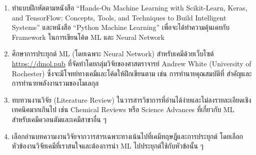 \begin{enumerate}[topsep=0pt,noitemsep]
    หลังจากนั้นให้เรียนคอร์ส ML โดยคอร์สที่ผมแนะนำคือคอร์สออนไลน์ของศาสตราจารย์ Andrew Ng (Stanford University) บน Coursera โดยมีสองคอร์สหลักคือ 
    \begin{enumerate}
        \item Machine Learning Specialization เป็นคอร์ส ML ที่ได้รับความนิยมมากที่สุดในโลก\footnote{\url{https://www.coursera.org/specializations/machine-learning-introduction}}
        
        \item Deep Learning Specialization เป็นคอร์สที่ได้รับความนิยมไม่แพ้กัน โดยจะเน้นไปที่ Neural Network\footnote{\url{https://www.coursera.org/specializations/deep-learning}}
    \end{enumerate}

    \noindent และคอร์สของ Stanford University ซึ่งมีศาสตราจารย์ Andrew Ng นำทีมสอนเช่นเดียวกัน
    \begin{enumerate}
        \item CS229: Machine Learning\footnote{\url{https://cs229.stanford.edu}}
        
        \item CS230: Deep Learning\footnote{\url{https://cs230.stanford.edu}}
    \end{enumerate}
    
    \item ทำแบบฝึกหัดตามหนังสือ \enquote{Hands-On Machine Learning with Scikit-Learn, Keras, and TensorFlow: Concepts, Tools, and Techniques to Build Intelligent Systems} และหนังสือ \enquote{Python Machine Learning} เพื่อจะได้ทำความคุ้นเคยกับ Framework ในการเขียนโค้ด ML และ Neural Network
    
    \item ศึกษาการประยุกต์ ML (โดยเฉพาะ Neural Network) สำหรับเคมีด้วยเว็บไซต์ \url{https://dmol.pub} ที่จัดทำโดยกลุ่มวิจัยของศาสตราจารย์ Andrew White (University of Rochester) ซึ่งจะมีโจทย์ทางเคมีและโค้ดให้ฝึกเขียนตาม เช่น การทำนายคุณสมบัติที่    สำคัญและการทำนายพลังงานรวมของโมเลกุล
    
    \item ทบทวนงานวิจัย (Literature Review) ในวารสารวิชาการที่อ่านได้ง่ายและไม่ลงรายละเอียดเชิงเทคนิคมากเกินไป เช่น Chemical Reviews หรือ Science Advances ที่เกี่ยวกับ ML สำหรับเคมีควอนตัมและเคมีสาขาอื่น ๆ
    
    \item เลือกอ่านบทความงานวิจัยจากวารสารเฉพาะทางเน้นไปที่เคมีทฤษฎีและการประยุกต์ โดยเลือกหัวข้องานวิจัยเคมีที่เราสนใจและต้องการนำ ML ไปประยุกต์ใช้กับหัวข้อนั้น ๆ
\end{enumerate}


